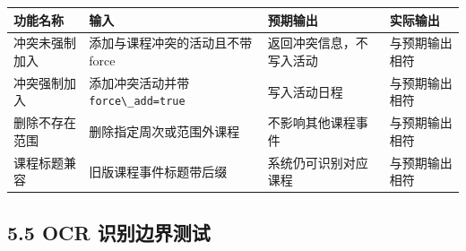 {\def\LTcaptype{none} %
\begin{longtable}[]{@{}|
  >{\raggedright\arraybackslash}p{}|
  >{\raggedright\arraybackslash}p{}|
  >{\raggedright\arraybackslash}p{}|
  >{\raggedright\arraybackslash}p{}|@{}}
\hline
\rowcolor{gray!12}
\begin{minipage}[b]{\linewidth}\raggedright
\bfseries 功能名称
\end{minipage} & \begin{minipage}[b]{\linewidth}\raggedright
\bfseries 输入
\end{minipage} & \begin{minipage}[b]{\linewidth}\raggedright
\bfseries 预期输出
\end{minipage} & \begin{minipage}[b]{\linewidth}\raggedright
\bfseries 实际输出
\end{minipage} \\
\hline
\endhead
\hline
\endlastfoot
冲突未强制加入 & 添加与课程冲突的活动且不带 force &
返回冲突信息，不写入活动 & 与预期输出相符 \\
\hline
冲突强制加入 & 添加冲突活动并带
\passthrough{\lstinline!force\_add=true!} & 写入活动日程 &
与预期输出相符 \\
\hline
删除不存在范围 & 删除指定周次或范围外课程 & 不影响其他课程事件 &
与预期输出相符 \\
\hline
课程标题兼容 & 旧版课程事件标题带后缀 & 系统仍可识别对应课程 &
与预期输出相符 \\
\hline
\end{longtable}
}

\subsection{5.5 OCR
识别边界测试}\label{ocr-ux8bc6ux522bux8fb9ux754cux6d4bux8bd5}

